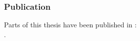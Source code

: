 \frame
{
  \frametitle{Publication}
	Parts of this thesis have been published in \cite{Qadah}:\\
	.  	
  
}